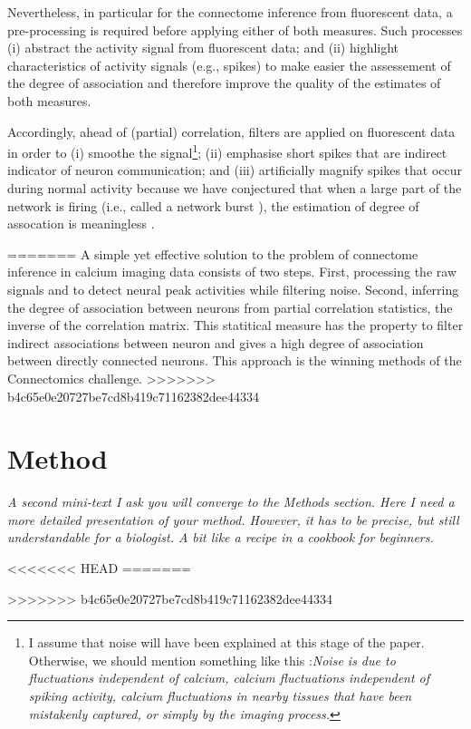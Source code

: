 \documentclass[wcp]{jmlr}
\begin{document}
Nevertheless, in particular for the connectome inference from fluorescent
data, a pre-processing is required before applying either of both measures.
Such processes (i) abstract the activity signal from fluorescent data; and
(ii) highlight characteristics of activity signals (e.g., spikes) to make
easier the assessement of the degree of association and therefore improve the
quality of the estimates of both measures.

Accordingly, ahead of (partial) correlation, filters are applied on fluorescent data in order to (i) smoothe the signal\footnote{I assume that noise will have been explained at this stage of the paper. Otherwise, we should mention something like this :\textit{Noise is due to fluctuations independent of calcium, calcium fluctuations independent of spiking activity, calcium fluctuations in nearby tissues that have been mistakenly captured, or simply by the imaging process.}}; (ii) emphasise short spikes that are indirect indicator of neuron communication; and (iii) artificially magnify spikes that occur during normal activity because we have conjectured that when a large part of the network is firing (i.e., called a network burst \citep{stetter2012model}), the estimation of degree of assocation is meaningless \citep{sutera2014simple}.


=======
A simple yet effective solution to the problem of connectome inference in
calcium imaging data consists of two steps. \cite{sutera2014simple} First,
processing the raw signals and to detect neural peak activities while filtering
noise. Second, inferring the degree of association between neurons from partial
correlation statistics, the inverse of the correlation matrix. This statitical
measure has the property to filter indirect associations between neuron and
gives a high degree of association between directly connected neurons. This
approach is the winning methods of the Connectomics challenge.
>>>>>>> b4c65e0e20727be7cd8b419c71162382dee44334

\section{Method}
\emph{A second mini-text I ask you will converge to the Methods section. Here I need
a more detailed presentation of your method. However, it has to be precise, but
still understandable for a biologist. A bit like a recipe in a cookbook for
beginners.}

<<<<<<< HEAD
=======

>>>>>>> b4c65e0e20727be7cd8b419c71162382dee44334

\newpage

\end{document}
